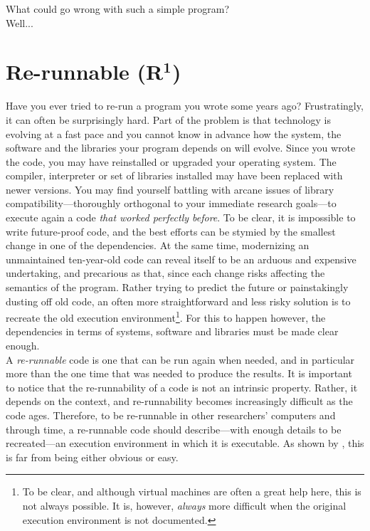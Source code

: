 \documentclass[a4paper,11pt]{article}
\begin{document}
What could go wrong with such a simple program?\\
\vfill
Well...
\vfill


\clearpage
\section*{Re-runnable (R$^{\mathbf 1}$)}

Have you ever tried to re-run a program you wrote some years ago? Frustratingly, it can often be surprisingly hard. Part of the problem is that technology is evolving at a fast pace and you cannot know in advance how the system, the software and the libraries your program depends on will evolve. Since you wrote the code, you may have reinstalled or upgraded  your operating system. The compiler, interpreter or set of libraries installed may have been replaced with newer versions. You may find yourself battling with arcane issues of library compatibility---thoroughly orthogonal to your immediate research  goals---to execute again a code \emph{that worked perfectly before}. To be clear, it is impossible to write future-proof code, and the best efforts can be stymied by the smallest change in one of the dependencies. At the same time, modernizing an unmaintained ten-year-old code can reveal itself to be an arduous and expensive undertaking, and precarious as that, since each change risks affecting the semantics of the program. Rather trying to predict the future or painstakingly dusting off old code, an often more straightforward and less risky solution is to recreate the old execution environment\footnote{To be clear, and although virtual machines are often a great help here, this is not always possible. It is, however, \emph{always} more difficult when the original execution environment is not documented.}. For this to happen however, the dependencies in terms of systems, software and libraries must be made clear enough.\\

A \emph{re-runnable} code is one that can be run again when needed, and in particular more than the one time that was needed to produce the results. It is important to notice that the re-runnability of a code is not an intrinsic property. Rather, it depends on the context, and re-runnability becomes increasingly difficult as the code ages. Therefore, to be re-runnable in other researchers' computers and through time, a re-runnable code should describe---with enough details to be recreated---an execution environment in which it is executable. As shown by \citep{Collberg:2016}, this is far from being either obvious or easy.\\
\end{document}
